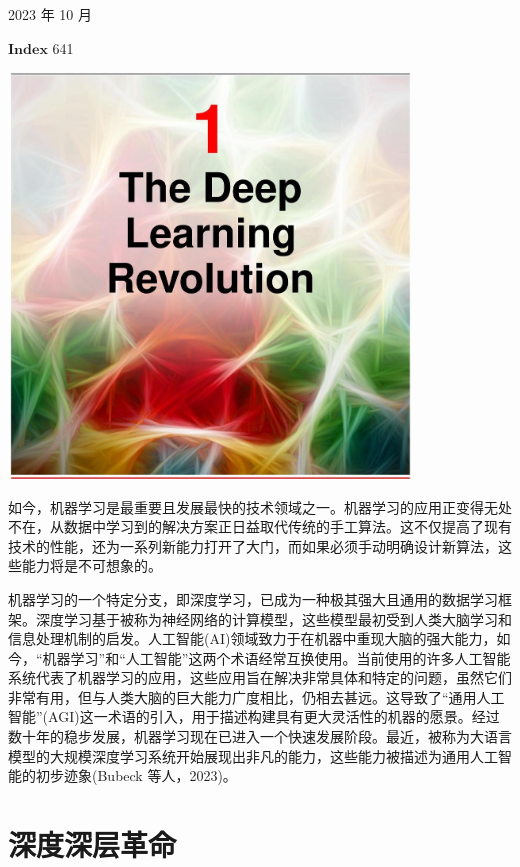 \documentclass[10pt]{article}
\begin{document}
2023 年 10 月

\tableofcontents %





\(\mathbf{{Index}}\) 641

\begin{center}
\includegraphics[max width=0.8\textwidth]{images/0194e279-9b28-703a-88f4-c3ac21e2010d_20_474_353_1074_1083_0.jpg}
\end{center}
\hspace*{3em} 

如今，机器学习是最重要且发展最快的技术领域之一。机器学习的应用正变得无处不在，从数据中学习到的解决方案正日益取代传统的手工算法。这不仅提高了现有技术的性能，还为一系列新能力打开了大门，而如果必须手动明确设计新算法，这些能力将是不可想象的。

机器学习的一个特定分支，即深度学习，已成为一种极其强大且通用的数据学习框架。深度学习基于被称为神经网络的计算模型，这些模型最初受到人类大脑学习和信息处理机制的启发。人工智能(AI)领域致力于在机器中重现大脑的强大能力，如今，“机器学习”和“人工智能”这两个术语经常互换使用。当前使用的许多人工智能系统代表了机器学习的应用，这些应用旨在解决非常具体和特定的问题，虽然它们非常有用，但与人类大脑的巨大能力广度相比，仍相去甚远。这导致了“通用人工智能”(AGI)这一术语的引入，用于描述构建具有更大灵活性的机器的愿景。经过数十年的稳步发展，机器学习现在已进入一个快速发展阶段。最近，被称为大语言模型的大规模深度学习系统开始展现出非凡的能力，这些能力被描述为通用人工智能的初步迹象(Bubeck 等人，2023)。

\chapter{深度深层革命}
\end{document}
